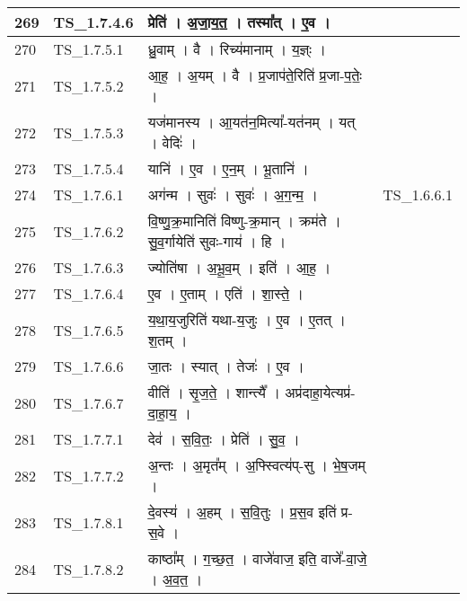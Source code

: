 \documentclass[17pt]{extarticle}
\begin{document}
\begin{longtable}{||p{0.4in}||p{0.9in}||p{4.0in}||p{0.9in}||}
        \hline
            269 & TS\_1.7.4.6 & प्रेति॑   ।   अ॒जा॒य॒त॒   ।   तस्मा᳚त्   ।   ए॒व   ।    &      \\
        \hline
            270 & TS\_1.7.5.1 & ध्रु॒वाम्   ।   वै   ।   रिच्य॑मानाम्   ।   य॒ज्ञ्ः   ।    &      \\
        \hline
            271 & TS\_1.7.5.2 & आ॒ह॒   ।   अ॒यम्   ।   वै   ।   प्र॒जाप॑ते॒रिति॑ प्र॒जा{-}प॒तेः॒   ।    &      \\
        \hline
            272 & TS\_1.7.5.3 & यज॑मानस्य   ।   आ॒यत॑न॒मित्या᳚{-}यत॑नम्   ।   यत्   ।   वेदिः॑   ।    &      \\
        \hline
            273 & TS\_1.7.5.4 & यानि॑   ।   ए॒व   ।   ए॒न॒म्   ।   भू॒तानि॑   ।    &      \\
        \hline
            274 & TS\_1.7.6.1 & अग॑न्म   ।   सुवः॑   ।   सुवः॑   ।   अ॒ग॒न्म॒   ।    & TS\_1.6.6.1        \\
        \hline
            275 & TS\_1.7.6.2 & वि॒ष्णु॒क्र॒मानिति॑ विष्णु{-}क्र॒मान्   ।   क्रम॑ते   ।   सु॒व॒र्गायेति॑ सुवः{-}गाय॑   ।   हि   ।    &      \\
        \hline
            276 & TS\_1.7.6.3 & ज्योति॑षा   ।   अ॒भू॒व॒म्   ।   इति॑   ।   आ॒ह॒   ।    &      \\
        \hline
            277 & TS\_1.7.6.4 & ए॒व   ।   ए॒ताम्   ।   एति॑   ।   शा॒स्ते॒   ।    &      \\
        \hline
            278 & TS\_1.7.6.5 & य॒था॒य॒जुरिति॑ यथा{-}य॒जुः   ।   ए॒व   ।   ए॒तत्   ।   श॒तम्   ।    &      \\
        \hline
            279 & TS\_1.7.6.6 & जा॒तः   ।   स्यात्   ।   तेजः॑   ।   ए॒व   ।    &      \\
        \hline
            280 & TS\_1.7.6.7 & वीति॑   ।   सृ॒ज॒ते॒   ।   शान्त्यै᳚   ।   अप्र॑दाहा॒येत्यप्र॑{-}दा॒हा॒य॒   ।    &      \\
        \hline
            281 & TS\_1.7.7.1 & देव॑   ।   स॒वि॒तः॒   ।   प्रेति॑   ।   सु॒व॒   ।    &      \\
        \hline
            282 & TS\_1.7.7.2 & अ॒न्तः   ।   अ॒मृत᳚म्   ।   अ॒फ्स्वित्य॑प्{-}सु   ।   भे॒ष॒जम्   ।    &      \\
        \hline
            283 & TS\_1.7.8.1 & दे॒वस्य॑   ।   अ॒हम्   ।   स॒वि॒तुः   ।   प्र॒स॒व इति॑ प्र{-}स॒वे   ।    &      \\
        \hline
            284 & TS\_1.7.8.2 & काष्ठा᳚म्   ।   ग॒च्छ॒त॒   ।   वाजे॑वाज॒ इति॒ वाजे᳚{-}वा॒जे॒   ।   अ॒व॒त॒   ।    &      \\

\end{longtable}
\end{document}
